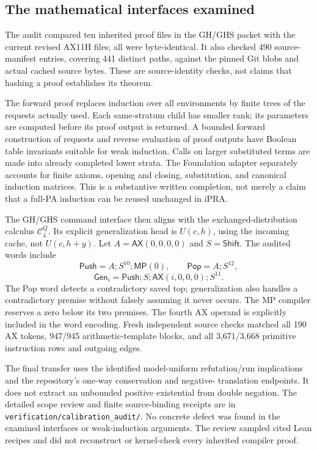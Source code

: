\documentclass[11pt,letterpaper]{article}
\newcommand{\file}[1]{\nolinkurl{#1}}
\begin{document}
\subsection{The mathematical interfaces examined}
The audit compared ten inherited proof files in the GH/GHS packet with the
current revised AX11H files; all were byte-identical. It also checked 490
source-manifest entries, covering 441 distinct paths, against the pinned
Git blobs and actual cached source bytes. These are source-identity checks,
not claims that hashing a proof establishes its theorem.

The forward proof replaces induction over all environments by finite trees
of the requests actually used. Each same-stratum child has smaller rank;
its parameters are computed before its proof output is returned. A bounded
forward construction of requests and reverse evaluation of proof outputs
have Boolean table invariants suitable for weak induction. Calls on larger
substituted terms are made into already completed lower strata. The
Foundation adapter separately accounts for finite axioms, opening and
closing, substitution, and canonical induction matrices. This is a
substantive written completion, not merely a claim that a full-PA induction
can be reused unchanged in iPRA.

The GH/GHS command interface then aligns with the exchanged-distribution
calculus $\mathcal C_4^Q$. Its explicit generalization head is $U(c,h)$,
using the incoming cache, not $U(c,h+y)$. Let
$A=\mathsf{AX}(0,0,0,0)$ and $S=\mathsf{Shift}$. The audited words include
\[
\mathsf{Push}=A;S^{10};\mathsf{MP}(0),\qquad
\mathsf{Pop}=A;S^{12},
\]
\[
\mathsf{Gen}_i=\mathsf{Push};S;\mathsf{AX}(i,0,0,0);S^{11}.
\]
The Pop word detects a contradictory saved top; generalization also handles
a contradictory premise without falsely assuming it never occurs. The
MP compiler reserves a zero below its two premises. The fourth AX operand
is explicitly included in the word encoding. Fresh independent source
checks matched all 190 AX tokens, 947/945 arithmetic-template blocks, and
all 3,671/3,668 primitive instruction rows and outgoing edges.

The final transfer uses the identified model-uniform refutation/run
implications and the repository's one-way conservation and negative-
translation endpoints. It does not extract an unbounded positive
existential from double negation. The detailed scope review and finite
source-binding receipts are in \file{verification/calibration_audit/}.
No concrete defect was found in the examined interfaces or weak-induction
arguments. The review sampled cited Lean recipes and did not reconstruct
or kernel-check every inherited compiler proof.
\end{document}
